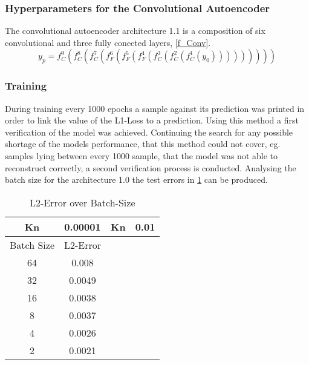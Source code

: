 \subsubsection{Hyperparameters for the Convolutional Autoencoder}\label{Convolutional}
The convolutional autoencoder architecture 1.1 is a composition of six convolutional and three fully conected layers, \cref{f_Conv}.
\begin{equation}
y_p = f_{C}^9(f_{C}^8(f_{C}^7(f_{F}^6(f_{F}^5(f_{F}^4(f_{C}^3(f_{C}^2(f_{C}^1(y_0)))))))))
\label{f_Conv}
\end{equation}
\subsubsection{Training}
During training every 1000 epochs a sample against its prediction was printed in order to link the value of the L1-Loss to a prediction. Using this method a first verification of the model was achieved. Continuing the search for any possible shortage of the models performance, that this method could not cover, eg. samples lying between every 1000 sample, that the model was not able to reconstruct correctly, a second verification process is conducted.
Analysing the batch size for the architecture 1.0 the test errors in \cref{Tab:Batch} can be produced.
\begin{table}[!htbp]\centering
	\begin{tabular}{ |c c|c c| }
		\hline
		Kn & 0.00001& Kn &0.01  \\ [.5ex]
		\hline
		Batch Size & L2-Error && \\ \hline
		64 & 0.008  &&\\ 
		32 & 0.0049 &&\\ \hline
		16 & 0.0038 &&\\ \hline
		8 & 0.0037&&\\ \hline
		4 & 0.0026&&\\ \hline
		2 & 0.0021&&\\
		\hline
	\end{tabular}
	\caption{L2-Error over Batch-Size}
	\label{Tab:Batch}
\end{table}

